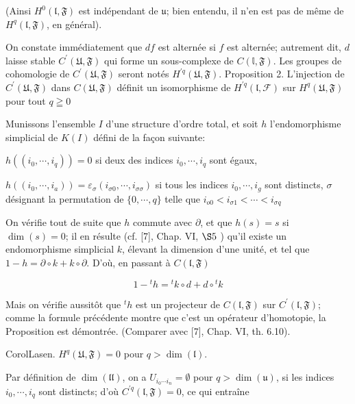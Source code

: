(Ainsi $H^{0}(\mathfrak{l}, \mathfrak{F})$ est indépendant de $\mathfrak{u}$; bien entendu, il n'en est pas de même de $H^{q}(\mathfrak{l}, \mathfrak{F})$, en général).

On constate immédiatement que $d f$ est alternée si $f$ est alternée; autrement dit, $d$ laisse stable $C^{\prime}(\mathfrak{U}, \mathfrak{F})$ qui forme un sous-complexe de $C(\mathbb{l}, \mathfrak{F})$. Les groupes de cohomologie de $C^{\prime}(\mathfrak{U}, \mathfrak{F})$ seront notés $H^{\prime q}(\mathfrak{U}, \mathfrak{F})$. Proposition 2. L'injection de $C^{\prime}(\mathfrak{U}, \mathfrak{F})$ dans $C(\mathfrak{U}, \mathfrak{F})$ définit un isomorphisme de $H^{\prime q}(\mathfrak{l}, \mathcal{F})$ sur $H^{q}(\mathfrak{U}, \mathfrak{F})$ pour tout $q \geqq 0$

Munissons l'ensemble $I$ d'une structure d'ordre total, et soit $h$ l'endomorphisme simplicial de $K(I)$ défini de la façon suivante:

$h\left(\left(i_{0}, \cdots, i_{q}\right)\right)=0$ si deux des indices $i_{0}, \cdots, i_{q}$ sont égaux,

$h\left(\left(i_{0}, \cdots, i_{a}\right)\right)=\varepsilon_{\sigma}\left(i_{\sigma 0}, \cdots, i_{\sigma \sigma}\right)$ si tous les indices $i_{0}, \cdots, i_{g}$ sont distincts, $\sigma$ désignant la permutation de $\{0, \cdots, q\}$ telle que $i_{o 0}<i_{\sigma 1}<\cdots<i_{\sigma q}$

On vérifie tout de suite que $h$ commute avec $\partial$, et que $h(s)=s$ si $\operatorname{dim}(s)=0$; il en résulte (cf. [7], Chap. VI, $\S 5$ ) qu'il existe un endomorphisme simplicial $k$, élevant la dimension d'une unité, et tel que $1-h=\partial \circ k+k \circ \partial .$ D'où, en passant à $C(\mathfrak{l}, \mathfrak{F})$

$$
1-{ }^{t} h={ }^{t} k \circ d+d \circ{ }^{t} k
$$

Mais on vérifie aussitôt que ${ }^{t} h$ est un projecteur de $C(\mathfrak{l}, \mathfrak{F})$ sur $C^{\prime}(\mathfrak{l}, \mathfrak{F}) ;$ comme la formule précédente montre que c'est un opérateur d'homotopie, la Proposition est démontrée. (Comparer avec [7], Chap. VI, th. 6.10).

CorolLasen. $H^{q}(\mathfrak{U}, \mathfrak{F})=0$ pour $q>\operatorname{dim}(\mathfrak{l})$.

Par définition de $\operatorname{dim}(\mathfrak{l l})$, on a $U_{i_{0} \cdots i_{n}}=\emptyset$ pour $q>\operatorname{dim}(\mathfrak{u})$, si les indices $i_{0}, \cdots, i_{q}$ sont distincts; d'où $C^{\prime q}(\mathfrak{l}, \mathfrak{F})=0$, ce qui entraîne

